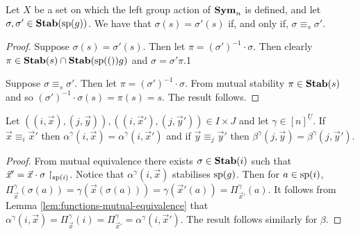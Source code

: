 \documentclass[../paper.tex]{subfiles}
\begin{document}
\begin{lem}
  Let $X$ be a set on which the left group action of $\text{\textbf{Sym}}_n$ is defined, and
  let $\sigma, \sigma' \in \text{\textbf{Stab}}(\text{sp}(g))$. We have that $\sigma(s) = \sigma'
  (s)$ if, and only if, $\sigma \equiv_s \sigma'$.
  \label{lem:functions-mutual-equivalence}
\end{lem}
\begin{proof}
  Suppose $\sigma(s) = \sigma'(s)$. Then let $\pi = (\sigma')^{-1} \cdot
  \sigma$. Then clearly $\pi \in \text{\textbf{Stab}}(s) \cap \text{\textbf{Stab}} (\text{sp} (())g)$ and $\sigma = \sigma'
  \pi$.1

  Suppose $\sigma \equiv_s \sigma'$. Then let $\pi = (\sigma')^{-1} \cdot
  \sigma$. From mutual stability $\pi \in \text{\textbf{Stab}} (s)$ and so $(\sigma')^{-1}\cdot
  \sigma (s) = \pi (s) = s$. The result follows.
\end{proof}

\begin{lem}
  Let $((i, \vec{x}), (j, \vec{y})), ((i, \vec{x}'), (j, \vec{y}')) \in I \times
  J$ and let $\gamma \in [n]^{\underline{U}}$. If $\vec{x} \equiv_i \vec{x}'$ then $\alpha^{\gamma}(i, \vec{x}) =
  \alpha^{\gamma}(i, \vec{x}')$ and if $\vec{y} \equiv_j \vec{y}'$ then $\beta^{\gamma}(j, \vec{y}) =
  \beta^{\gamma}(j, \vec{y}')$.
  \label{lem:alpha-beta-mutal-equivalence}
\end{lem}
\begin{proof}
  From mutual equivalence there exists $\sigma \in \text{\textbf{Stab}}(i)$ such that $\vec{x}' = \vec{x}
  \cdot {\sigma}\restriction_{\text{sp}(i)}$. Notice that $\alpha^{\gamma}(i, \vec{x})$ stabilises $\text{sp}(g)$. Then for $a \in
  \text{sp}(i)$, $\Pi^{\gamma}_{\vec{x}} (\sigma (a)) = \gamma (\vec{x}(\sigma
  (a))) = \gamma (\vec{x}'(a)) = \Pi^{\gamma}_{\vec{x}'}(a)$. It follows from
  Lemma \ref{lem:functions-mutual-equivalence} that $\alpha^{\gamma}(i,\vec{x}) =
  \Pi^{\gamma}_{\vec{x}} (i) = \Pi^{\gamma}_{\vec{x}'} = \alpha^{\gamma}(i, \vec{x}')$. The result follows
  similarly for $\beta$.
\end{proof}

\end{document}
